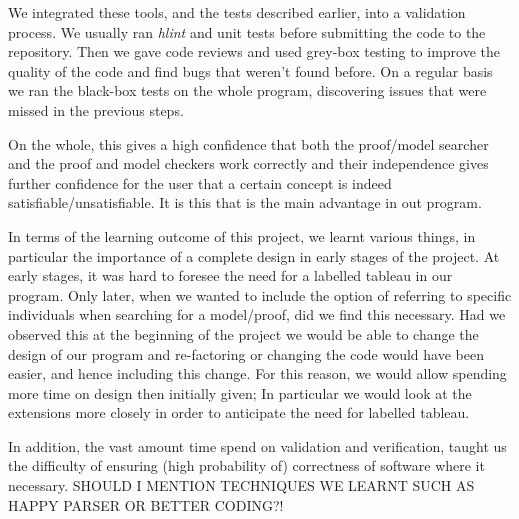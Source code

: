 We integrated these tools, and the tests described earlier, into a validation process.
We usually ran \emph{hlint} and unit tests before submitting the code to the
repository. Then we gave code reviews and used grey-box testing to improve
the quality of the code and find bugs that weren't found before. On a regular
basis we ran the black-box tests on the whole program, discovering issues
that were missed in the previous steps.

On the whole, this gives a high confidence that both the proof/model searcher and the proof and model checkers work correctly and their independence gives further confidence for the user that a certain concept is indeed satisfiable/unsatisfiable.  It is this that is the main advantage in out program.

In terms of the learning outcome of this project, we learnt various things, in particular the importance of a complete design in early stages of the project. At early stages, it was hard to foresee the need for a labelled tableau in our program. Only later, when we wanted to include the option of referring to specific individuals when searching for a model/proof, did we find this necessary. Had we observed this at the beginning of the project we would be able to change the design of our program and re-factoring or changing the code would have been easier, and hence including this change. For this reason, we would allow spending more time on design then initially given; In particular we would look at the extensions more closely in order to anticipate the need for labelled tableau.

In addition, the vast amount time spend on validation and verification, taught us the difficulty of ensuring (high probability of) correctness of software where it necessary. SHOULD I MENTION TECHNIQUES WE LEARNT SUCH AS HAPPY PARSER OR BETTER CODING?!
 
